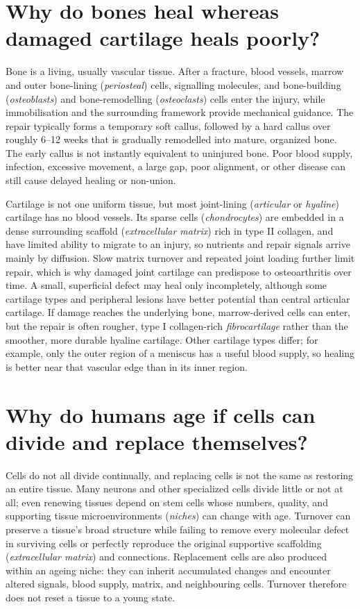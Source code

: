 \documentclass[11pt,oneside]{report}
\begin{document}
\section{Why do bones heal whereas damaged cartilage heals poorly?}

Bone is a living, usually vascular tissue. After a fracture, blood vessels,
marrow and outer bone-lining (\emph{periosteal}) cells, signalling molecules,
and bone-building (\emph{osteoblasts}) and bone-remodelling (\emph{osteoclasts})
cells enter the injury, while immobilisation and the surrounding framework
provide mechanical guidance. The repair typically forms a temporary soft
callus, followed by a hard callus over roughly 6--12 weeks that is gradually
remodelled into mature, organized bone. The early callus is not instantly
equivalent to uninjured bone. Poor blood supply, infection, excessive movement,
a large gap, poor alignment, or other disease can still cause delayed healing
or non-union.

Cartilage is not one uniform tissue, but most joint-lining (\emph{articular} or
\emph{hyaline}) cartilage has no blood vessels. Its sparse cells
(\emph{chondrocytes}) are embedded in a dense surrounding scaffold
(\emph{extracellular matrix}) rich in type II collagen, and have limited ability
to migrate to an injury, so nutrients and repair signals arrive mainly by
diffusion. Slow matrix turnover and repeated joint loading further limit repair,
which is why damaged joint cartilage can predispose to osteoarthritis over time.
A small, superficial defect may heal only incompletely, although some cartilage
types and peripheral lesions have better potential than central articular
cartilage. If damage reaches the underlying bone, marrow-derived cells can
enter, but the repair is often rougher, type I collagen-rich
\emph{fibrocartilage} rather than the smoother, more durable hyaline cartilage. Other cartilage types differ; for example, only the
outer region of a meniscus has a useful blood supply, so healing is better near
that vascular edge than in its inner region.

\section{Why do humans age if cells can divide and replace themselves?}

Cells do not all divide continually, and replacing cells is not the same as
restoring an entire tissue. Many neurons and other specialized cells divide
little or not at all; even renewing tissues depend on stem cells whose numbers,
quality, and supporting tissue microenvironments (\emph{niches}) can change
with age. Turnover can preserve a tissue's broad structure while failing to
remove every molecular defect in surviving cells or perfectly reproduce the
original supportive scaffolding (\emph{extracellular matrix}) and connections.
Replacement cells are also produced within an ageing niche: they
can inherit accumulated changes and encounter altered signals, blood supply,
matrix, and neighbouring cells. Turnover therefore does not reset a tissue to a
young state.
\end{document}

